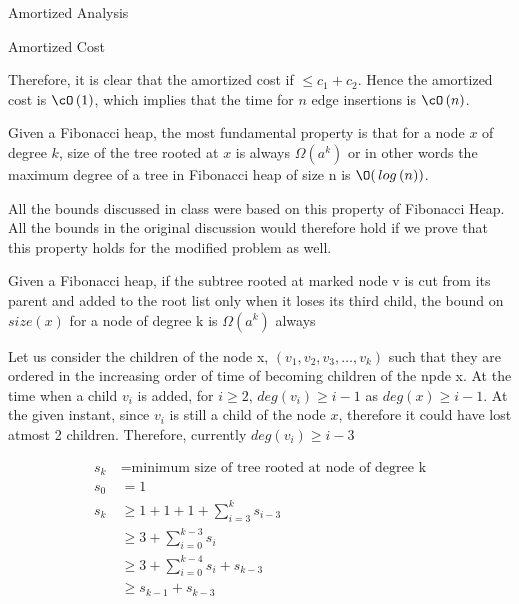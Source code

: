 \documentclass{article}
\begin{document}
\begin{question}
\begin{qsection}{Amortized Analysis}
\begin{qsubsection}{Amortized Cost}
             \br%


            Therefore, it is clear that the amortized cost if $\le c_1 + c_2$. Hence the amortized cost is $\bigO{1}$, which implies that the time for $n$ edge insertions is $\bigO{n}$.

        \end{qsubsection}

    \end{qsection}

\end{question}

\begin{question}

	Given a Fibonacci heap, the most fundamental property is that for a node $x$ of degree $k$, size of the tree rooted at $x$ is always $\Omega(a^k)$ or in other words the maximum degree of a tree in Fibonacci heap of size n is $\O(\log n)$. \br%

	All the bounds discussed in class were based on this property of Fibonacci Heap. All the bounds in the original discussion would therefore hold if we prove that this property holds for the modified problem as well. \br%

	\begin{qproof}{Given a Fibonacci heap, if the subtree rooted at marked node v is cut from its parent and added to the root list only when it loses its third child, the bound on $size(x)$ for a node of degree k is $\Omega(a^k)$ always}

		Let us consider the children of the node x, $(v_1, v_2, v_3, \ldots, v_k)$ such that they are ordered in the increasing order of time of becoming children of the npde x. At the time when a child $v_i$ is added, for $i \geq 2$, $deg(v_i) \geq i-1$ as $deg(x) \geq i-1$. At the given instant, since $v_i$ is still a child of the node $x$, therefore it could have lost atmost 2 children. Therefore, currently $deg(v_i) \geq i-3$

	\begin{align*}
		s_k &\ = \text{minimum size of tree rooted at node of degree k} \\
		s_0 &\ = 1 \\
		s_k &\ \geq 1 + 1 + 1 + \sum_{i=3}^ks_{i-3} \\
		&\ \geq 3 + \sum_{i=0}^{k-3}s_i \\
		&\ \geq 3 + \sum_{i=0}^{k-4}s_i + s_{k-3} \\
		&\ \geq s_{k-1} + s_{k-3} \\
	\end{align*}


\end{qproof}
\end{question}
\end{document}
